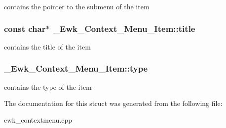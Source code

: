 contains the pointer to the submenu of the item \hypertarget{struct__Ewk__Context__Menu__Item_a5726653c8bdb5c146a83b7450e4314e8}{
\subsubsection[{title}]{\setlength{\rightskip}{0pt plus 5cm}const char$\ast$ \+\_\+\+Ewk\+\_\+\+Context\+\_\+\+Menu\+\_\+\+Item\+::title}}\label{struct__Ewk__Context__Menu__Item_a5726653c8bdb5c146a83b7450e4314e8}
contains the title of the item \hypertarget{struct__Ewk__Context__Menu__Item_a5ded85edf55b8e2c3c10c77e4dffa1cf}{
\subsubsection[{type}]{ \+\_\+\+Ewk\+\_\+\+Context\+\_\+\+Menu\+\_\+\+Item\+::type}}\label{struct__Ewk__Context__Menu__Item_a5ded85edf55b8e2c3c10c77e4dffa1cf}
contains the type of the item 

The documentation for this struct was generated from the following file\+:\begin{DoxyCompactItemize}
\item 
ewk\+\_\+contextmenu.\+cpp\end{DoxyCompactItemize}
